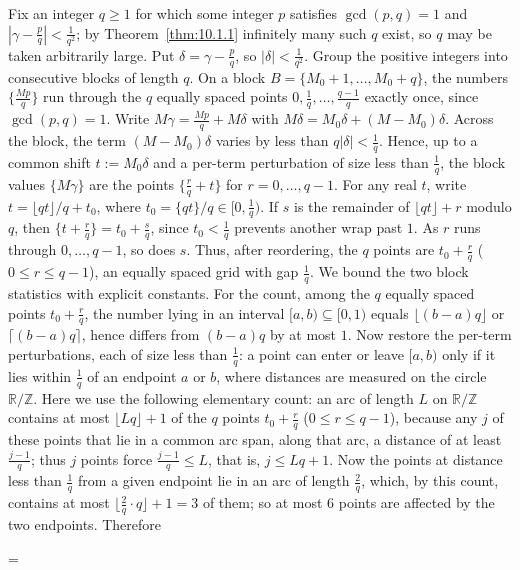\documentclass[11pt]{article}
\makeatletter
\let\nt@closedisplay\]
\def\nt@guardedclose{\@ifnextchar\par{\nt@closeafterpar}{\@ifnextchar\end{\postdisplaypenalty\@M\nt@closedisplay}{\nt@closedisplay}}}
\def\nt@closeafterpar\par{\@ifnextchar\par{\nt@closeafterpar}{\@ifnextchar\end{\postdisplaypenalty\@M\nt@closedisplay\par}{\nt@closedisplay\par}}}
\renewenvironment{proof}[1][\proofname]{\par
  \pushQED{\qed}\normalfont\topsep\medskipamount\edef\nt@afterproof{\@endparpenalty=\the\@endparpenalty\relax}\@beginparpenalty\@M\@endparpenalty\@M\let\]\nt@guardedclose\trivlist\item[]\textit{#1\@addpunct{.}} \ignorespaces}{\ifvmode\addpenalty\@M\fi\popQED\nt@afterproof\endtrivlist\@endpefalse}
\theoremstyle{ntstyle}
\makeatother
\begin{document}
\begin{proof} Fix an integer $q\ge1$ for
  which some integer $p$ satisfies $\gcd(p, q)=1$ and $|\gamma-\tfrac{p}{q}|<\tfrac{1}{q^2}$; by
  Theorem~\ref{thm:10.1.1} infinitely many such $q$ exist,
  so $q$ may be taken arbitrarily large. Put $\delta=\gamma-\tfrac{p}{q}$,
  so $|\delta|<\tfrac{1}{q^2}$. Group the positive integers into
  consecutive blocks of length $q$. On a block
  $B=\{M_0+1,\ldots,M_0+q\}$, the numbers $\{\tfrac{Mp}{q}\}$ run through
  the $q$ equally spaced points $0,\tfrac{1}{q},\ldots,\tfrac{q-1}{q}$ exactly
  once, since $\gcd(p, q)=1$. Write $M\gamma=\tfrac{Mp}{q}+M\delta$ with
  $M\delta=M_0\delta+(M-M_0)\delta$. Across the block, the term
  $(M-M_0)\delta$ varies by less than $q|\delta|<\tfrac{1}{q}$. Hence, up
  to a common shift $t:=M_0\delta$ and a per-term perturbation of size
  less than $\tfrac{1}{q}$, the block values $\{M\gamma\}$ are the points $\{\tfrac{r}{q}+t\}$ for
  $r=0,\ldots,q-1$. For any real $t$, write
  $t=\lfloor qt\rfloor/q+t_0$, where $t_0=\{qt\}/q\in[0,\tfrac{1}{q})$.
  If $s$ is the remainder of $\lfloor qt\rfloor+r$ modulo $q$, then
  $\{t+\tfrac{r}{q}\}=t_0+\tfrac{s}{q}$, since $t_0<\tfrac{1}{q}$
  prevents another wrap past $1$. As $r$ runs through $0,\ldots,q-1$, so
  does $s$. Thus, after reordering, the $q$ points are
  $t_0+\tfrac{r}{q}$ ($0\le r\le q-1$), an equally spaced grid with gap
  $\tfrac{1}{q}$. We bound the two block
  statistics with explicit constants. For the count, among the $q$ equally
  spaced points $t_0+\tfrac{r}{q}$, the number lying in an interval
  $[a,b)\subseteq[0,1)$ equals $\lfloor(b-a)q\rfloor$ or
  $\lceil(b-a)q\rceil$, hence differs from $(b-a)q$ by at most $1$. Now
  restore the per-term perturbations, each of size less than $\tfrac{1}{q}$: a point
  can enter or leave $[a,b)$ only if it lies within
  $\tfrac{1}{q}$ of an endpoint $a$ or $b$, where distances are measured on the circle
  $\mathbb{R}/\mathbb{Z}$. Here we use the following elementary count: an
  arc of length $L$ on $\mathbb{R}/\mathbb{Z}$ contains at most $\lfloor Lq\rfloor + 1$ of the $q$ points
  $t_0 + \tfrac{r}{q}$ ($0 \le r \le q-1$), because any $j$ of these points that lie in a common arc span,
  along that arc, a distance of at least $\tfrac{j-1}{q}$; thus $j$ points
  force $\tfrac{j-1}{q} \le L$, that is, $j \le Lq + 1$. Now the points at
  distance less than $\tfrac{1}{q}$ from a given endpoint lie in an arc of length
  $\tfrac{2}{q}$, which, by this count, contains at most
  $\lfloor\tfrac{2}{q}\cdot q\rfloor + 1 = 3$ of them; so at most $6$
  points are affected by the two endpoints. Therefore

\end{proof}
\end{document}
